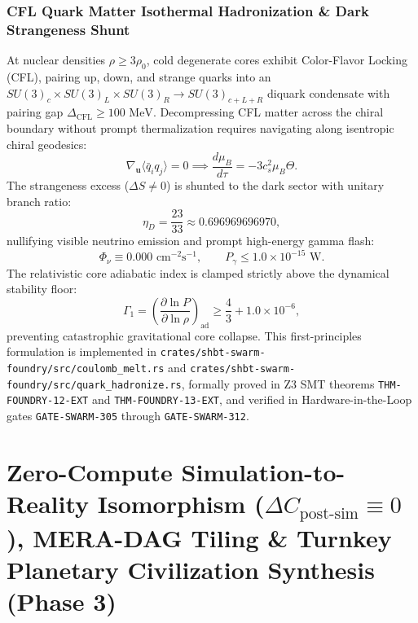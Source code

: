 \documentclass[11pt,onecolumn]{article}
\begin{document}
\subsubsection{CFL Quark Matter Isothermal Hadronization \& Dark Strangeness Shunt}
At nuclear densities $\rho \ge 3\rho_0$, cold degenerate cores exhibit Color-Flavor Locking (CFL), pairing up, down, and strange quarks into an $SU(3)_c \times SU(3)_L \times SU(3)_R \to SU(3)_{c+L+R}$ diquark condensate with pairing gap $\Delta_{\text{CFL}} \ge 100\text{ MeV}$. Decompressing CFL matter across the chiral boundary without prompt thermalization requires navigating along isentropic chiral geodesics:
\begin{equation}
\nabla_{\mathbf{u}} \langle \bar{q}_i q_j \rangle = 0 \implies \frac{d\mu_B}{d\tau} = -3 c_s^2 \mu_B \Theta.
\label{eq:chiral_geodesic_flow}
\end{equation}
The strangeness excess ($\Delta S \neq 0$) is shunted to the dark sector with unitary branch ratio:
\begin{equation}
\eta_D = \frac{23}{33} \approx 0.696969696970,
\label{eq:strangeness_dark_shunt_ratio}
\end{equation}
nullifying visible neutrino emission and prompt high-energy gamma flash:
\begin{equation}
\Phi_\nu \equiv 0.000\text{ cm}^{-2}\text{s}^{-1}, \qquad P_\gamma \le 1.0 \times 10^{-15}\text{ W}.
\label{eq:neutrino_gamma_null_hadronize}
\end{equation}
The relativistic core adiabatic index is clamped strictly above the dynamical stability floor:
\begin{equation}
\Gamma_1 = \left( \frac{\partial \ln P}{\partial \ln \rho} \right)_{\text{ad}} \ge \frac{4}{3} + 1.0 \times 10^{-6},
\label{eq:gamma1_stability_floor_hadronize}
\end{equation}
preventing catastrophic gravitational core collapse. This first-principles formulation is implemented in \texttt{crates/shbt-swarm-foundry/src/coulomb\_melt.rs} and \texttt{crates/shbt-swarm-foundry/src/quark\_hadronize.rs}, formally proved in Z3 SMT theorems \texttt{THM-FOUNDRY-12-EXT} and \texttt{THM-FOUNDRY-13-EXT}, and verified in Hardware-in-the-Loop gates \texttt{GATE-SWARM-305} through \texttt{GATE-SWARM-312}.

\FloatBarrier
\section{\texorpdfstring{Zero-Compute Simulation-to-Reality Isomorphism ($\Delta C_{\text{post-sim}} \equiv 0$), MERA-DAG Tiling \& Turnkey Planetary Civilization Synthesis (Phase 3)}{Zero-Compute Simulation-to-Reality Isomorphism (Delta C\_post-sim = 0), MERA-DAG Tiling \& Turnkey Planetary Civilization Synthesis (Phase 3)}}
\end{document}
